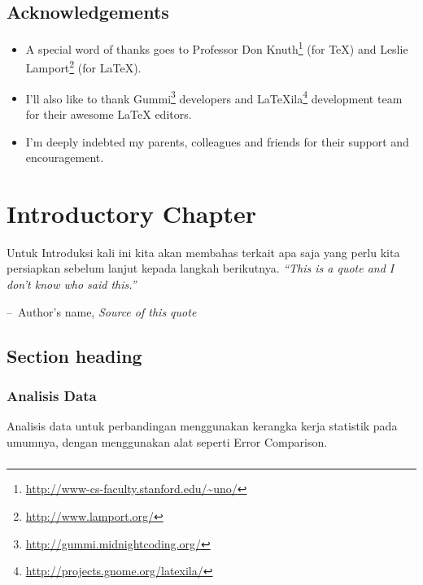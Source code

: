 \documentclass[a4paper,11pt]{book}
\makeatletter
\newenvironment{chapquote}[2][2em]
  {\setlength{\@tempdima}{#1}%
   \def\chapquote@author{#2}%
   \parshape 1 \@tempdima \dimexpr\textwidth-2\@tempdima\relax%
   \itshape}
  {\par\normalfont\hfill--\ \chapquote@author\hspace*{\@tempdima}\par\bigskip}
\makeatother
\begin{document}
\section*{Acknowledgements}
\begin{itemize}
\item A special word of thanks goes to Professor Don Knuth\footnote{\url{http://www-cs-faculty.stanford.edu/~uno/}} (for \TeX{}) and Leslie Lamport\footnote{\url{http://www.lamport.org/}} (for \LaTeX{}).
\item I'll also like to thank Gummi\footnote{\url{http://gummi.midnightcoding.org/}} developers and LaTeXila\footnote{\url{http://projects.gnome.org/latexila/}} development team for their awesome \LaTeX{} editors.
\item I'm deeply indebted my parents, colleagues and friends for their support and encouragement.
\end{itemize}

\chapter{Introductory Chapter}
Untuk Introduksi kali ini kita akan membahas terkait apa saja yang perlu kita persiapkan sebelum lanjut kepada langkah berikutnya.
\begin{chapquote}{Author's name, \textit{Source of this quote}}
``This is a quote and I don't know who said this.''
\end{chapquote}

\section{Section heading}


\subsection{Analisis Data}
Analisis data untuk perbandingan menggunakan kerangka kerja statistik pada umumnya, dengan
menggunakan alat seperti Error Comparison.

\subsection{}

\subsection{}


\subsection{}
\end{document}
